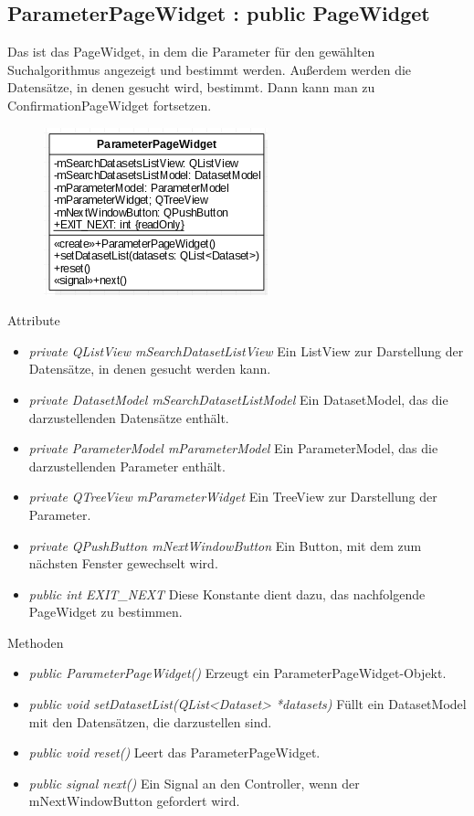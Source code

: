 \subsection*{ParameterPageWidget : public PageWidget}
Das ist das PageWidget, in dem die Parameter für den gewählten \gls{Suchalgorithmus} angezeigt und bestimmt werden. Außerdem werden die Datensätze, in denen gesucht wird, bestimmt. Dann kann man zu ConfirmationPageWidget fortsetzen.

\begin{figure}[H]
	\centering
	\includegraphics[scale=0.5]{img/Klassendiagramm/Klassen/View/ParameterPageWidget}
	\label{fig:parameterPageWidget}
\end{figure}

Attribute
\begin{itemize}
	\item\textit{private QListView mSearchDatasetListView}
	Ein ListView zur Darstellung der Datensätze, in denen gesucht werden kann.
	\item\textit{private DatasetModel mSearchDatasetListModel}
	Ein DatasetModel, das die darzustellenden Datensätze enthält.
	\item\textit{private ParameterModel mParameterModel}
	Ein ParameterModel, das die darzustellenden Parameter enthält.
	\item\textit{private QTreeView mParameterWidget}
	Ein TreeView zur Darstellung der Parameter.
	\item\textit{private QPushButton mNextWindowButton}
	Ein Button, mit dem zum nächsten Fenster gewechselt wird.
	\item\textit{public int EXIT\_NEXT} 
	Diese Konstante dient dazu, das nachfolgende PageWidget zu bestimmen.    
\end{itemize}

Methoden
\begin{itemize}
	\item\textit{public ParameterPageWidget()}
	Erzeugt ein ParameterPageWidget-Objekt.
	\item\textit{public void setDatasetList(QList<Dataset> *datasets)}
	Füllt ein DatasetModel mit den Datensätzen, die darzustellen sind.
	\item\textit{public void reset()}
	Leert das ParameterPageWidget.
	\item\textit{public signal next()}
	Ein Signal an den Controller, wenn der mNextWindowButton gefordert wird. 
\end{itemize}

